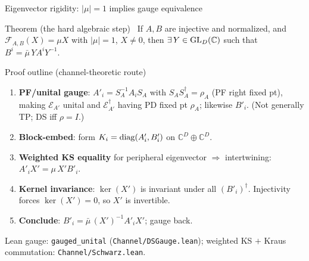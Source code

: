 \documentclass[aspectratio=169,10pt]{beamer}
\newcommand{\cE}{\mathcal{E}}
\newcommand{\cF}{\mathcal{F}}
\begin{document}
\begin{frame}{Eigenvector rigidity: $|\mu|=1$ implies gauge equivalence}
    \vspace{-0.6em}

    \begin{block}{Theorem (the hard algebraic step)~\cite{Wolf2012Quantum}}
        If $A,B$ are injective and normalized, and $\cF_{A,B}(X) = \mu X$ with $|\mu|=1$,
        $X\neq 0$, then $\exists\,Y\in\mathrm{GL}_D(\mathbb{C})$ such that $B^i = \bar\mu\, Y A^i Y^{-1}$.
    \end{block}

    \begin{block}{Proof outline (channel-theoretic route)}
        \begin{enumerate}\itemsep0.1em
            \item \textbf{PF/unital gauge}: $A'_i = S_A^{-1}A_i S_A$ with $S_A S_A^\dagger = \rho_A$
                  (PF right fixed pt), making $\cE_{A'}$ unital and $\cE_{A'}^\dagger$ having PD fixed pt
                  $\rho_A$; likewise $B'_i$. (Not generally TP; DS iff $\rho=I$.)
            \item \textbf{Block-embed}: form $K_i = \mathrm{diag}(A'_i, B'_i)$ on $\mathbb{C}^D \oplus \mathbb{C}^D$.
            \item \textbf{Weighted KS equality} for peripheral eigenvector $\Rightarrow$ intertwining:
                  $A'_i X' = \mu\, X' B'_i$.
            \item \textbf{Kernel invariance}: $\ker(X')$ is invariant under all $(B'_i)^\dagger$.
                  Injectivity forces $\ker(X') = 0$, so $X'$ is invertible.
            \item \textbf{Conclude}: $B'_i = \bar\mu\,(X')^{-1}A'_i X'$; gauge back.
        \end{enumerate}
    \end{block}
    \textcolor{dimwhite}{\footnotesize Lean gauge: \texttt{gauged\_unital} (\texttt{Channel/DSGauge.lean});
        weighted KS $+$ Kraus commutation: \texttt{Channel/Schwarz.lean}.}
\end{frame}
\end{document}
